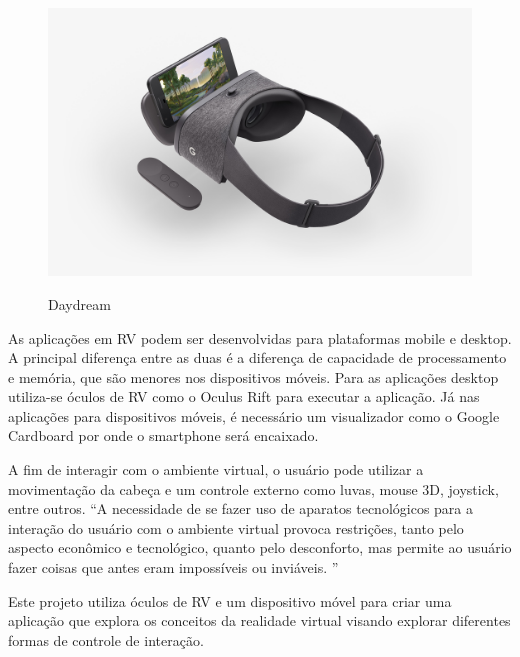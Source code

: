 \begin{figure}[ht]
	\caption{\small Daydream}
	\centering
	\includegraphics[scale=0.15]{Imagens/daydream.jpg}
	\label{f.daydream}
\end{figure}

As aplicações em RV podem ser desenvolvidas para plataformas mobile e desktop. A principal diferença entre as duas é a diferença de capacidade de processamento e memória, que são menores nos dispositivos móveis. Para as aplicações desktop utiliza-se óculos de RV como o Oculus Rift para executar a aplicação. Já nas aplicações para dispositivos móveis, é necessário um visualizador como o Google Cardboard por onde o smartphone será encaixado.

A fim de interagir com o ambiente virtual, o usuário pode utilizar a movimentação da cabeça e um controle externo como luvas, mouse 3D, joystick, entre outros. “A necessidade de se fazer uso de aparatos tecnológicos para a interação do usuário com o ambiente virtual provoca restrições, tanto pelo aspecto econômico e tecnológico, quanto pelo desconforto, mas permite ao usuário fazer coisas que antes eram impossíveis ou inviáveis. ” \cite[p. ~3]{torilivro}

Este projeto utiliza óculos de RV e um dispositivo móvel para criar uma aplicação que explora os conceitos da realidade virtual visando explorar diferentes formas de controle de interação.

